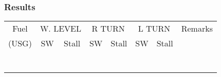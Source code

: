 % 
% 
%
\Large
\subsubsection*{Results}
  \begin{tabularx}{\textwidth}{|c||c|c||c|c||c|c||X|}
    \hline
    Fuel&\multicolumn{2}{c||}{W. LEVEL}&\multicolumn{2}{c||}{R TURN}&\multicolumn{2}{c||}{L TURN}&Remarks\\
    \cline{2-7}
    (USG)&SW&Stall&SW&Stall&SW&Stall&\\
    \hline
    \hline
    &&&&&&&\\
    \hline
    &&&&&&&\\
    \hline
    &&&&&&&\\
    \hline
    &&&&&&&\\
    \hline
    &&&&&&&\\
    \hline
    &&&&&&&\\
    \hline
    &&&&&&&\\
    \hline
    \end{tabularx}     
    \normalsize

   